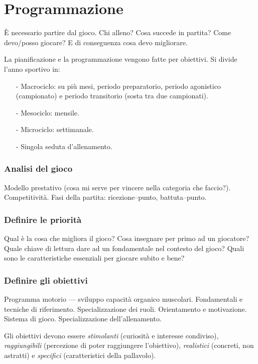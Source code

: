 \section{Programmazione}\label{programmazione}
\`E necessario partire dal gioco. Chi alleno? Cosa succede in partita? Come devo/posso giocare? E di conseguenza cosa devo migliorare.
\begin{ross}
La pianificazione e la programmazione vengono fatte per obiettivi. Si divide
l'anno sportivo in:
\begin{enumerate}
\item[-]Macrociclo: su più mesi, periodo preparatorio, periodo agonistico
(campionato) e periodo transitorio (sosta tra due campionati).
\item[-]Mesociclo: mensile.
\item[-]Microciclo: settimanale.
\item[-]Singola seduta d'allenamento.
\end{enumerate}
\end{ross}

\subsubsection{Analisi del gioco}
Modello prestativo (cosa mi serve per vincere nella categoria che faccio?).
Competitività.
Fasi della partita: ricezione--punto, battuta--punto.

\subsubsection{Definire le priorità}
Qual è la cosa che migliora il gioco? Cosa insegnare per primo ad un giocatore? Quale chiave di lettura dare ad un fondamentale nel contesto del gioco? Quali sono le caratteristiche essenziali per giocare subito e bene?

\subsubsection{Definire gli obiettivi}
Programma motorio --- sviluppo capacità organico muscolari.
Fondamentali e tecniche di riferimento.
Specializzazione dei ruoli.
Orientamento e motivazione.
Sistema di gioco.
Specializzazione dell'allenamento.

Gli obiettivi devono essere \emph{stimolanti} (curiosità e interesse condiviso),
\emph{raggiungibili} (percezione di poter raggiungere l'obiettivo),
\emph{realistici} (concreti, non astratti) e \emph{specifici} (caratteristici
della pallavolo).

